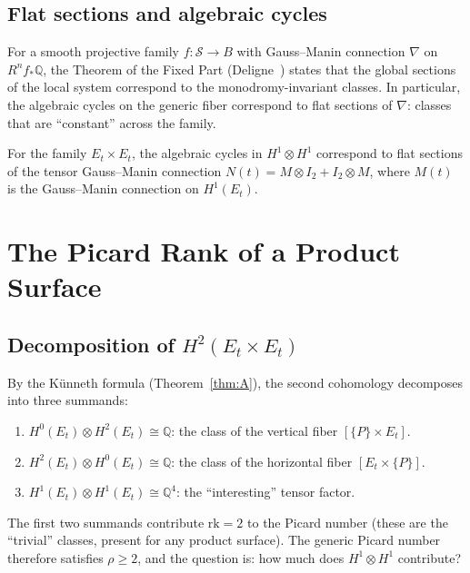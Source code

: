 \documentclass[11pt]{article}
\theoremstyle{plain}
\theoremstyle{definition}
\theoremstyle{remark}
\newcommand{\Q}{\mathbb{Q}}
\newcommand{\rk}{\mathrm{rk}}
\begin{document}
\subsection{Flat sections and algebraic cycles}

For a smooth projective family $f : \mathcal{S} \to B$ with Gauss--Manin connection $\nabla$ on $R^n f_* \Q$, the Theorem of the Fixed Part (Deligne~\cite{Deligne1972}) states that the global sections of the local system correspond to the monodromy-invariant classes.
In particular, the algebraic cycles on the generic fiber correspond to flat sections of $\nabla$: classes that are ``constant'' across the family.

For the family $E_t \times E_t$, the algebraic cycles in $H^1 \otimes H^1$ correspond to flat sections of the tensor Gauss--Manin connection $N(t) = M \otimes I_2 + I_2 \otimes M$, where $M(t)$ is the Gauss--Manin connection on $H^1(E_t)$.

\section{The Picard Rank of a Product Surface}
\label{sec:picard}

\subsection{Decomposition of $H^2(E_t \times E_t)$}

By the K\"unneth formula (Theorem~\ref{thm:A}), the second cohomology decomposes into three summands:

\begin{enumerate}
  \item $H^0(E_t) \otimes H^2(E_t) \cong \Q$: the class of the vertical fiber $[\{P\} \times E_t]$.
  \item $H^2(E_t) \otimes H^0(E_t) \cong \Q$: the class of the horizontal fiber $[E_t \times \{P\}]$.
  \item $H^1(E_t) \otimes H^1(E_t) \cong \Q^4$: the ``interesting'' tensor factor.
\end{enumerate}

The first two summands contribute $\rk = 2$ to the Picard number (these are the ``trivial'' classes, present for any product surface).
The generic Picard number therefore satisfies $\rho \geq 2$, and the question is: how much does $H^1 \otimes H^1$ contribute?
\end{document}
